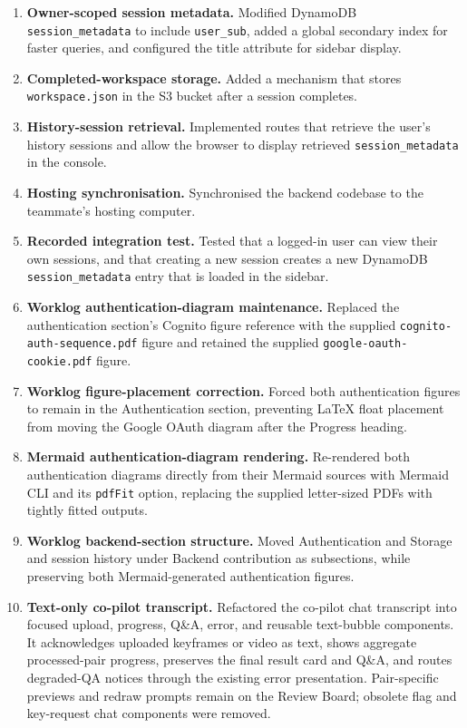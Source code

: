 \begin{enumerate}
  \item \textbf{Owner-scoped session metadata.} Modified DynamoDB \texttt{session\_metadata} to include \texttt{user\_sub}, added a global secondary index for faster queries, and configured the title attribute for sidebar display.

  \item \textbf{Completed-workspace storage.} Added a mechanism that stores \texttt{workspace.json} in the S3 bucket after a session completes.

  \item \textbf{History-session retrieval.} Implemented routes that retrieve the user's history sessions and allow the browser to display retrieved \texttt{session\_metadata} in the console.

  \item \textbf{Hosting synchronisation.} Synchronised the backend codebase to the teammate's hosting computer.

  \item \textbf{Recorded integration test.} Tested that a logged-in user can view their own sessions, and that creating a new session creates a new DynamoDB \texttt{session\_metadata} entry that is loaded in the sidebar.

  \item \textbf{Worklog authentication-diagram maintenance.} Replaced the authentication section's Cognito figure reference with the supplied \texttt{cognito-auth-sequence.pdf} figure and retained the supplied \texttt{google-oauth-cookie.pdf} figure.

  \item \textbf{Worklog figure-placement correction.} Forced both authentication figures to remain in the Authentication section, preventing LaTeX float placement from moving the Google OAuth diagram after the Progress heading.

  \item \textbf{Mermaid authentication-diagram rendering.} Re-rendered both authentication diagrams directly from their Mermaid sources with Mermaid CLI and its \texttt{pdfFit} option, replacing the supplied letter-sized PDFs with tightly fitted outputs.

  \item \textbf{Worklog backend-section structure.} Moved Authentication and Storage and session history under Backend contribution as subsections, while preserving both Mermaid-generated authentication figures.

  \item \textbf{Text-only co-pilot transcript.} Refactored the co-pilot chat transcript into focused upload, progress, Q\&A, error, and reusable text-bubble components. It acknowledges uploaded keyframes or video as text, shows aggregate processed-pair progress, preserves the final result card and Q\&A, and routes degraded-QA notices through the existing error presentation. Pair-specific previews and redraw prompts remain on the Review Board; obsolete flag and key-request chat components were removed.


\end{enumerate}
